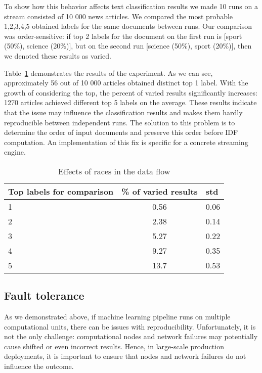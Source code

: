 To show how this behavior affects text classification results we made 10 runs on a stream consisted of 10 000 news articles. We compared the most probable 1,2,3,4,5 obtained labels for the same documents between runs. Our comparison was order-sensitive: if top 2 labels for the document on the first run is [sport (50\%), science (20\%)], but on the second run [science (50\%), sport (20\%)], then we denoted these results as varied. 

Table~\ref{race_table} demonstrates the results of the experiment. As we can see, approximately 56 out of 10 000 articles obtained distinct top 1 label. With the growth of considering the top, the percent of varied results significantly increases: 1270 articles achieved different top 5 labels on the average. These results indicate that the issue may influence the classification results and makes them hardly reproducible between independent runs. The solution to this problem is to determine the order of input documents and preserve this order before IDF computation. An implementation of this fix is specific for a concrete streaming engine.

\begin{table}[htbp]
\caption{Effects of races in the data flow}
\begin{threeparttable}
\begin{tabular}{lcl}
Top labels for comparison    & \% of varied results & std    \\
\hline
1   &   0.56    &   0.06    \\
2   &   2.38    &   0.14    \\
3   &   5.27    &   0.22    \\
4   &   9.27    &   0.35    \\
5   &   13.7    &   0.53    \\
\end{tabular}
\end{threeparttable}
\label{race_table}
\end{table}

\subsection{Fault tolerance}

As we demonstrated above, if machine learning pipeline runs on multiple computational units, there can be issues with reproducibility. Unfortunately, it is not the only challenge: computational nodes and network failures may potentially cause shifted or even incorrect results. Hence, in large-scale production deployments, it is important to ensure that nodes and network failures do not influence the outcome.

